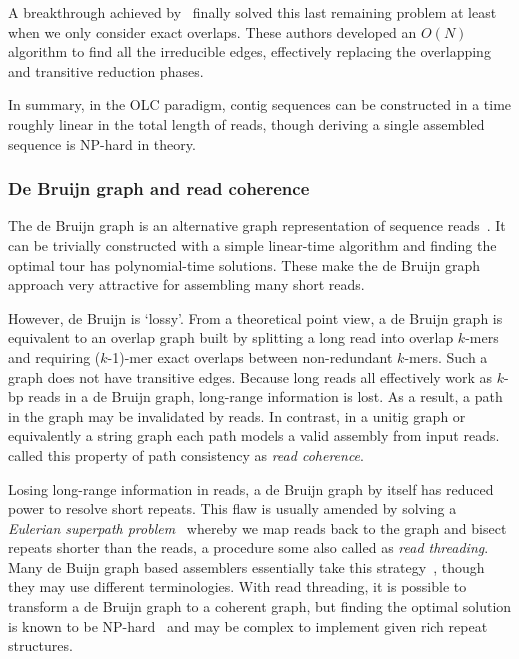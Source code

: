 \documentclass{bioinfo}
\begin{document}
\begin{methods}
A breakthrough achieved by~\citet{Simpson:2010uq} finally solved
this last remaining problem at least when we only consider exact overlaps.
These authors developed an $O(N)$ algorithm to find all the irreducible edges,
effectively replacing the overlapping and transitive reduction phases.

In summary, in the OLC paradigm, contig sequences can be constructed in a time
roughly linear in the total length of reads, though deriving a single assembled
sequence is NP-hard in theory.

\subsubsection{De Bruijn graph and read coherence}
The de Bruijn graph is an alternative graph representation of sequence
reads~\citep{Idury:1995oq}.  It can be trivially constructed with a simple
linear-time algorithm and finding the optimal tour has polynomial-time
solutions. These make the de Bruijn graph approach very attractive for
assembling many short reads.

However, de Bruijn is `lossy'. From a theoretical point view, a de Bruijn graph
is equivalent to an overlap graph built by splitting a long read into overlap
$k$-mers and requiring ($k$-1)-mer exact overlaps between non-redundant
$k$-mers.  Such a graph does not have transitive edges. Because long reads all
effectively work as $k$-bp reads in a de Bruijn graph, long-range information
is lost. As a result, a path in the graph may be invalidated by reads. In
contrast, in a unitig graph or equivalently a string graph each path models a
valid assembly from input reads. \citet{Myers:2005bh} called this property of
path consistency as \emph{read coherence}.

Losing long-range information in reads, a de Bruijn graph by itself has
reduced power to resolve short repeats. This flaw is usually amended by solving
a \emph{Eulerian superpath problem}~\citep{Pevzner:2001vn} whereby we
map reads back to the graph and bisect repeats shorter than the reads, a
procedure some also called as \emph{read threading}. Many de Buijn graph based
assemblers essentially take this
strategy~\citep{Chaisson:2009fk,Zerbino:2009ly,Li:2010vn}, though they may use
different terminologies.  With read threading, it is possible to transform a de
Bruijn graph to a coherent graph, but finding the optimal solution is known to be
NP-hard~\citep{DBLP:conf/wabi/MedvedevGMB07} and may be complex to implement
given rich repeat structures.


\end{methods}
\end{document}
